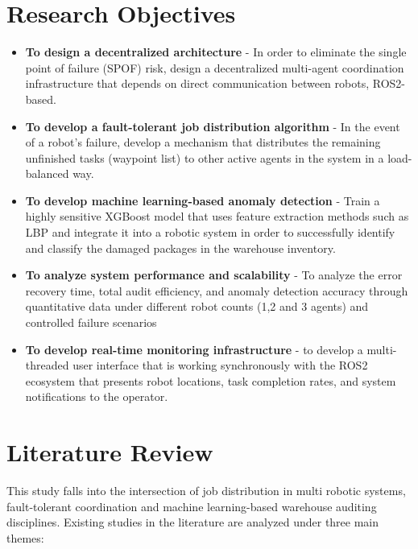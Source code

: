 \documentclass[conference]{IEEEtran}
\begin{document}
\section{Research Objectives}

\begin{itemize}

    \item \textbf{To design a decentralized architecture} - In order to eliminate the single point of failure (SPOF) risk, design a decentralized multi-agent coordination infrastructure that depends on direct communication between robots, ROS2-based. 

    \item \textbf{To develop a fault-tolerant job distribution algorithm} - In the event of a robot's failure, develop a mechanism that distributes the remaining unfinished tasks (waypoint list) to other active agents in the system in a load-balanced way. 

    \item \textbf{To develop machine learning-based anomaly detection} - Train a highly sensitive XGBoost model that uses feature extraction methods such as LBP and integrate it into a robotic system in order to successfully identify and classify the damaged packages in the warehouse inventory. 

    \item \textbf{To analyze system performance and scalability} - To analyze the error recovery time, total audit efficiency, and anomaly detection accuracy through quantitative data under different robot counts (1,2 and 3 agents) and controlled failure scenarios

    \item \textbf{To develop real-time monitoring infrastructure} - to develop a multi-threaded user interface that is working synchronously with the ROS2 ecosystem that presents robot locations, task completion rates, and system notifications to the operator. 

\end{itemize}

\section{Literature Review}

This study falls into the intersection of job distribution in multi robotic systems, fault-tolerant coordination and machine learning-based warehouse auditing disciplines. Existing studies in the literature are analyzed under three main themes:
\end{document}
